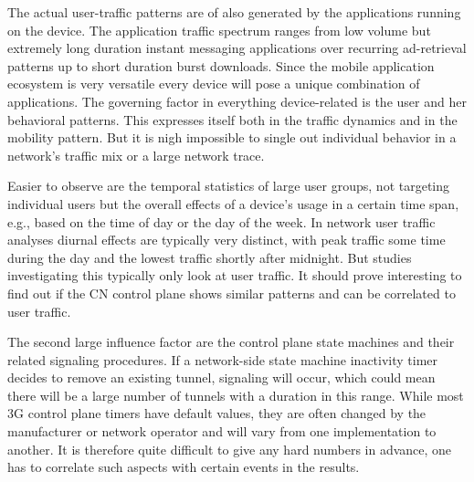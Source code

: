 The actual user-traffic patterns are of also generated by the applications running on the device. The application traffic spectrum ranges from low volume but extremely long duration instant messaging applications over recurring ad-retrieval patterns up to short duration burst downloads. Since the mobile application ecosystem is very versatile every device will pose a unique combination of applications. The governing factor in everything device-related is the user and her behavioral patterns. This expresses itself both in the traffic dynamics and in the mobility pattern. But it is nigh impossible to single out individual behavior in a network's traffic mix or a large network trace.

Easier to observe are the temporal statistics of large user groups, not targeting individual users but the overall effects of a device's usage in a certain time span, e.g., based on the time of day or the day of the week. In network user traffic analyses diurnal effects are typically very distinct, with peak traffic some time during the day and the lowest traffic shortly after midnight. But studies investigating this typically only look at user traffic. It should prove interesting to find out if the \gls{CN} control plane shows similar patterns and can be correlated to user traffic.

The second large influence factor are the control plane state machines and their related signaling procedures. If a network-side state machine inactivity timer decides to remove an existing tunnel, signaling will occur, which could mean there will be a large number of tunnels with a duration in this range. While most \gls{3G} control plane timers have default values, they are often changed by the manufacturer or network operator and will vary from one implementation to another. It is therefore quite difficult to give any hard numbers in advance, one has to correlate such aspects with certain events in the results.





